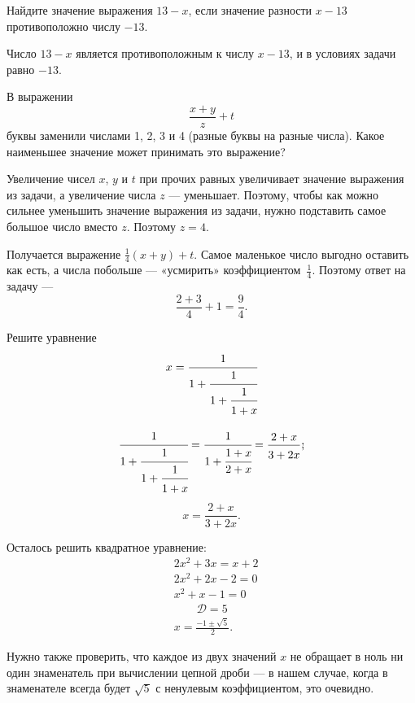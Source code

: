 

\begin{itemize}

	\itA Найдите значение выражения $13-x$, если значение разности $x-13$ противоположно числу $-13$.
	
	\itr Число $13-x$ является противоположным к числу $x-13$, и в условиях задачи равно $-13$.
	
	\itB В выражении
	$$\frac{x+y}{z} + t$$
	буквы заменили числами 1, 2, 3 и 4 (разные буквы на разные числа). Какое наименьшее значение может принимать это выражение?
	
	\itr Увеличение чисел $x$, $y$ и $t$ при прочих равных увеличивает значение выражения из задачи, а увеличение числа $z$ — уменьшает. Поэтому, чтобы как можно сильнее уменьшить значение выражения из задачи, нужно подставить самое большое число вместо $z$. Поэтому $z=4$.
	
	Получается выражение $\tfrac{1}{4} (x+y) + t$. Самое маленькое число выгодно оставить как есть, а числа побольше — «усмирить» коэффициентом~$\tfrac{1}{4}$. Поэтому ответ на задачу —
	$$\frac{2+3}{4} + 1 = \frac{9}{4}.$$
	
	\itC Решите уравнение
	$$x = \cfrac{1}{
		1 + \cfrac{1}{
			1 + \cfrac{1}{
				1+x \vphantom{\int^0}}}}$$
	
	\itr
	$$\cfrac{1}{
		1 + \cfrac{1}{
			1 + \cfrac{1}{
				1+x \vphantom{\int^0}}}}
	= \cfrac{1}{1+\cfrac{1+x}{2+x}}
	= \frac{2+x}{3+2x \vphantom{\int^0}}\scolon$$
	$$x = \frac{2+x}{3+2x}.$$
	
	Осталось решить квадратное уравнение:
	\begin{align*}
		& 2x^2 + 3x = x+2 \\
		& 2x^2 + 2x - 2 = 0 \\
		& x^2 + x - 1 = 0 \\
		& \qquad \mathcal D = 5 \\
		& x = \frac{-1 \pm \sqrt{5}}{2}.
	\end{align*}
	
	Нужно также проверить, что каждое из двух значений $x$ не обращает в ноль ни один знаменатель при вычислении цепной дроби — в нашем случае, когда в знаменателе всегда будет $\sqrt 5$ с ненулевым коэффициентом, это очевидно.

\end{itemize}


